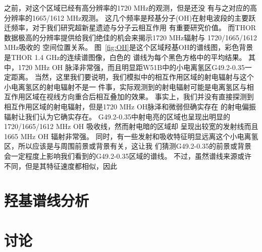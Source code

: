 之前，对这个区域已经有高分辨率的1720 MHz的观测\citep{2005ASPC..340..334B}，但是还没
有与之对应的高分辨率的1665/1612 MHz观测。
这几个频率是羟基分子(OH)在射电波段的主要跃迁频率，对于我们研究超新星遗迹与分子云相互作用
有重要研究价值。
而THOR数据极高的分辨率提供给我们绝佳的机会来揭示1720 MHz辐射与 1720/1665/1612 MHz吸收的
空间位置关系。
图~\ref{fig:OH}是这个区域羟基OH的谱线图，彩色背景是THOR 1.4 GHz的连续谱图像，白色的
谱线为每个黑色方格中的平均结果。
其中，1720 MHz OH 脉泽非常强，而且明显距W51B中的小电离氢区G49.2-0.35一定距离。
当然，这里我们要说明，我们模拟中的相互作用区域的射电辐射与这个小电离氢区的射电辐射不是一
件事，实际观测到的射电辐射可能是电离氢区与相互作用区域在视线方向重合后相互叠加的效果。
事实上，我们并没有直接探测到相互作用区域的射电辐射，但是1720 MHz OH脉泽和微弱但确实存在
的射电偏振辐射让我们认为它确实存在。
G49.2-0.35中射电亮的区域也呈现出明显的1720/1665/1612 MHz OH 吸收线，然而射电暗的区域却
呈现出较宽的发射线而且1665 MHz OH 辐射非常强。
同时，有一些发射和吸收特征明显远离这个小电离氢区，所以应该是与周围前景或背景有关，这让我
们猜测G49.2-0.35的前景或背景会一定程度上影响我们看到的G49.2-0.35区域的谱线。
不过，虽然谱线来源或许不同，但是其特征速度都相似，因此


\section{羟基谱线分析}
\section{讨论}

